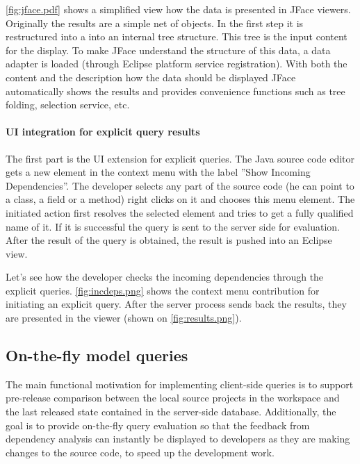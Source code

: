 \autoref{fig:jface.pdf} shows a simplified view how the data is presented in
JFace viewers. Originally the results are a simple net of objects. In the first
step it is restructured into a into an internal tree structure. This tree is the
input content for the display. To make JFace understand  the structure of this
data, a data adapter is loaded (through Eclipse platform service registration).
With both the content and the description how the data should be displayed JFace
automatically shows the results and provides convenience functions such as tree
folding, selection service, etc. 

\paragraph{UI integration for explicit query results} 
The first part is the UI extension for explicit queries. The Java source code
editor gets a new element in the context menu with the label ''Show Incoming
Dependencies''. The developer selects any part of the source code (he
can point to a class, a field or a method) right clicks on it and chooses this
menu element. The initiated action first resolves the selected element and tries
to get a fully qualified name of it. If it is successful the query is sent to
the server side for evaluation. After the result of the query is obtained, the 
result is pushed into an Eclipse view.

Let's see how the developer checks the incoming dependencies through the
explicit queries.
\autoref{fig:incdeps.png} shows the context menu contribution for initiating an
explicit query. After the server process sends back the results, they are presented 
in the viewer (shown on \autoref{fig:results.png}).
 

\subsection{On-the-fly model queries}

The main functional motivation for implementing client-side queries is to
support pre-release comparison between the local source projects in the
workspace and the last released state contained in the server-side database.
Additionally, the goal is to provide on-the-fly query evaluation so that the
feedback from dependency analysis can instantly be displayed to developers as
they are making changes to the source code, to speed up the development work.

